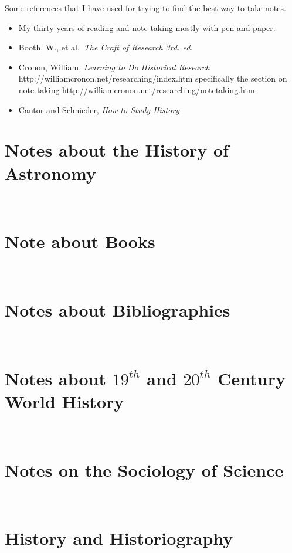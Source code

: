 \documentclass{article}
\begin{document}
Some references that I have used for trying to find the best way to take
notes.
\begin{itemize}
\item My thirty years of reading and note taking mostly with pen and  paper.
\item Booth, W., et al.\ {\it The Craft of Research 3rd. ed.}
  \cite{booth:2008}
\item Cronon, William, {\it Learning to Do Historical Research}
  http://williamcronon.net/researching/index.htm specifically the
  section on note taking
  http://williamcronon.net/researching/notetaking.htm
  \cite{cronon:2008}
\item Cantor and Schnieder, {\it How to Study History} \cite{cantor:1967}
\end{itemize}



\section{Notes about the History of Astronomy}\


\section{Note about Books}\


\section{Notes about Bibliographies}\


\section{Notes about \ensuremath{19^{th}} and \ensuremath{20^{th}} Century World History}\


%

\section{Notes on the Sociology of Science}\


\section{History and Historiography}\


\vfil\eject

\printbibliography
\end{document}
